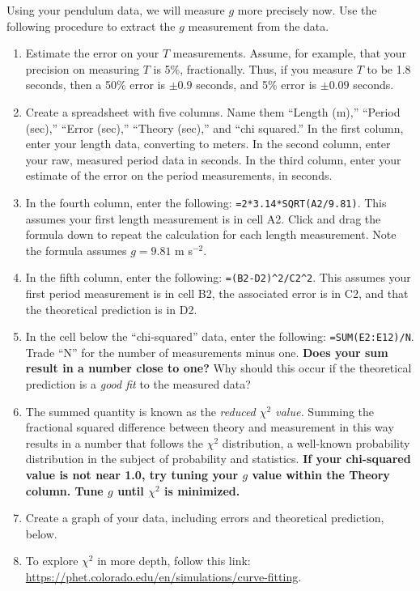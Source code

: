 \documentclass{article}
\begin{document}
Using your pendulum data, we will measure $g$ more precisely now.  Use the following procedure to extract the $g$ measurement from the data.
\begin{enumerate}
\item Estimate the error on your $T$ measurements.  Assume, for example, that your precision on measuring $T$ is 5\%, fractionally.  Thus, if you measure $T$ to be 1.8 seconds, then a 50\% error is $\pm 0.9$ seconds, and 5\% error is $\pm 0.09$ seconds.
\item Create a spreadsheet with five columns.  Name them ``Length (m),'' ``Period (sec),'' ``Error (sec),'' ``Theory (sec),'' and ``chi squared.''  In the first column, enter your length data, converting to meters.  In the second column, enter your raw, measured period data in seconds.  In the third column, enter your estimate of the error on the period measurements, in seconds.
\item In the fourth column, enter the following: \verb+=2*3.14*SQRT(A2/9.81)+.  This assumes your first length measurement is in cell A2.  Click and drag the formula down to repeat the calculation for each length measurement.  Note the formula assumes $g = 9.81$ m s$^{-2}$.
\item In the fifth column, enter the following: \verb+=(B2-D2)^2/C2^2+.  This assumes your first period measurement is in cell B2, the associated error is in C2, and that the theoretical prediction is in D2.
\item In the cell below the ``chi-squared'' data, enter the following: \verb+=SUM(E2:E12)/N+.  Trade ``N'' for the number of measurements minus one.  \textbf{Does your sum result in a number close to one?}  Why should this occur if the theoretical prediction is a \textit{good fit} to the measured data?
\item The summed quantity is known as the \textit{reduced $\chi^2$ value.}  Summing the fractional squared difference between theory and measurement in this way results in a number that follows the $\chi^2$ distribution, a well-known probability distribution in the subject of probability and statistics.  \textbf{If your chi-squared value is not near 1.0, try tuning your $g$ value within the Theory column.  Tune $g$ until $\chi^2$ is minimized.}
\item Create a graph of your data, including errors and theoretical prediction, below.
\item To explore $\chi^2$ in more depth, follow this link: \url{https://phet.colorado.edu/en/simulations/curve-fitting}.
\end{enumerate}
\end{document}
